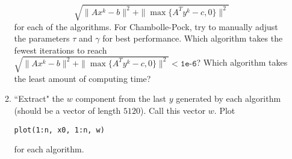 \documentclass[11pt]{article}
\begin{document}
\begin{enumerate}
\begin{enumerate}
$$
\sqrt{\|Ax^k - b\|^2 + \|\max\{A^Ty^k - c, 0\}\|^2}
$$ 
for each of the algorithms. For Chambolle-Pock, try to manually adjust the parameters $\tau$ and $\gamma$ for best performance. Which algorithm takes the fewest iterations to reach $\sqrt{\|Ax^k - b\|^2 + \|\max\{A^Ty^k - c, 0\}\|^2} < \texttt{1e-6}$? Which algorithm takes the least amount of computing time?
\item ``Extract" the $w$ component from the last $y$ generated by each algorithm (should be a vector of length $5120$). Call this vector $w$. Plot
\begin{verbatim}
plot(1:n, x0, 1:n, w)
\end{verbatim}
for each algorithm.
\end{enumerate}
\end{enumerate}
\end{document}
